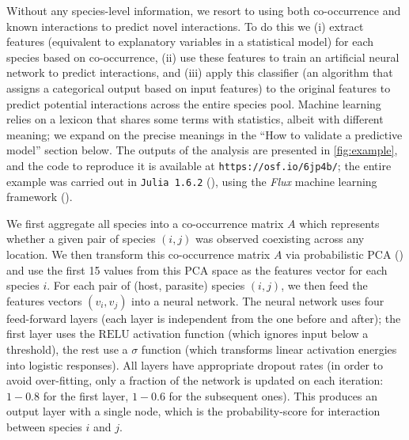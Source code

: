 \begin{refsection}
Without any species-level information, we resort to using both
co-occurrence and known interactions to predict novel interactions. To
do this we (i) extract features (equivalent to explanatory variables in
a statistical model) for each species based on co-occurrence, (ii) use
these features to train an artificial neural network to predict
interactions, and (iii) apply this classifier (an algorithm that assigns
a categorical output based on input features) to the original features
to predict potential interactions across the entire species pool.
Machine learning relies on a lexicon that shares some terms with
statistics, albeit with different meaning; we expand on the precise
meanings in the ``How to validate a predictive model'' section below.
The outputs of the analysis are presented in \autoref{fig:example}, and the code
to reproduce it is available at \texttt{https://osf.io/6jp4b/}; the
entire example was carried out in \texttt{Julia 1.6.2}
(\cite{Bezanson2017Julia}), using the \emph{Flux} machine learning
framework (\cite{Innes2018FluEle}).

We first aggregate all species into a co-occurrence matrix \(A\) which
represents whether a given pair of species \((i,j)\) was observed
coexisting across any location. We then transform this co-occurrence
matrix \(A\) via probabilistic PCA (\cite{Tipping1999ProPri}) and use the
first 15 values from this PCA space as the features vector for each
species \(i\). For each pair of (host, parasite) species \((i,j)\), we
then feed the features vectors \((v_i, v_j)\) into a neural network. The
neural network uses four feed-forward layers (each layer is independent
from the one before and after); the first layer uses the \(\text{RELU}\)
activation function (which ignores input below a threshold), the rest
use a \(\sigma\) function (which transforms linear activation energies
into logistic responses). All layers have appropriate dropout rates (in
order to avoid over-fitting, only a fraction of the network is updated
on each iteration: \(1-0.8\) for the first layer, \(1-0.6\) for the
subsequent ones). This produces an output layer with a single node,
which is the probability-score for interaction between species \(i\) and
\(j\).


\end{refsection}
